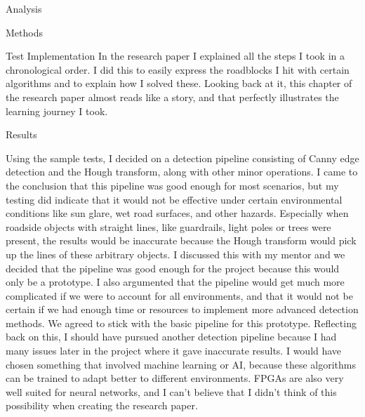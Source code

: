 \documentclass{matthijs}
\begin{document}
\begin{hoofdstuk}{Analysis}
\begin{paragraaf}{Methods}
\begin{subparagraaf}{Test Implementation}
				\noindent In the research paper I explained all the steps I took in a chronological order.
				I did this to easily express the roadblocks I hit with certain algorithms and to explain how I solved these.
				Looking back at it, this chapter of the research paper almost reads like a story, and that perfectly illustrates the learning journey I took.

			\end{subparagraaf}

		\end{paragraaf}

		\begin{paragraaf}{Results}
			
			Using the sample tests, I decided on a detection pipeline consisting of Canny edge detection and the Hough transform, along with other minor operations.
			I came to the conclusion that this pipeline was good enough for most scenarios, but my testing did indicate that it would not be effective under certain environmental conditions like sun glare, wet road surfaces, and other hazards.
			Especially when roadside objects with straight lines, like guardrails, light poles or trees were present, the results would be inaccurate because the Hough transform would pick up the lines of these arbitrary objects.
			I discussed this with my mentor and we decided that the pipeline was good enough for the project because this would only be a prototype.
			I also argumented that the pipeline would get much more complicated if we were to account for all environments, and that it would not be certain if we had enough time or resources to implement more advanced detection methods.
			We agreed to stick with the basic pipeline for this prototype.
			Reflecting back on this, I should have pursued another detection pipeline because I had many issues later in the project where it gave inaccurate results.
			I would have chosen something that involved machine learning or AI, because these algorithms can be trained to adapt better to different environments.
			FPGAs are also very well suited for neural networks, and I can't believe that I didn't think of this possibility when creating the research paper.

		\end{paragraaf}
	\end{hoofdstuk}
	
\end{document}
